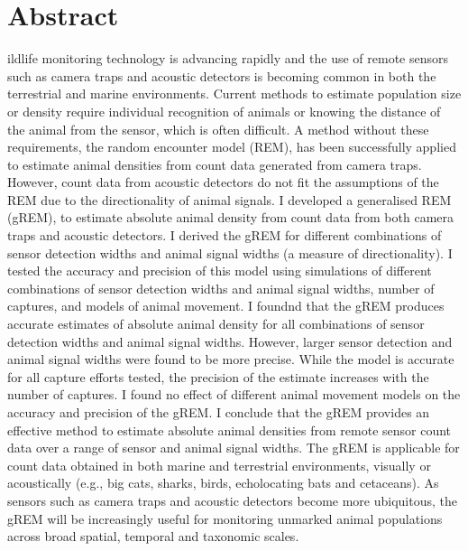 %








  



\section{Abstract}
ildlife monitoring technology is advancing rapidly and the use of remote sensors such as camera traps and acoustic detectors is becoming common in both the terrestrial and marine environments.
Current methods to estimate population size or density require individual recognition of animals or knowing the distance of the animal from the sensor, which is often difficult.
A method without these requirements, the random encounter model (REM), has been successfully applied to estimate animal densities from count data generated from camera traps.
However, count data from acoustic detectors do not fit the assumptions of the REM due to the directionality of animal signals.
I developed a generalised REM (gREM), to estimate absolute animal density from count data from both camera traps and acoustic detectors.
I derived the gREM for different combinations of sensor detection widths and animal signal widths (a measure of directionality).
I tested the accuracy and precision of this model using simulations of different combinations of sensor detection widths and animal signal widths, number of captures, and models of animal movement. 
I foundnd that the gREM produces accurate estimates of absolute animal density for all combinations of sensor detection widths and animal signal widths.
However, larger sensor detection and animal signal widths were found to be more precise.
While the model is accurate for all capture efforts tested, the precision of the estimate increases with the number of captures.
I found no effect of different animal movement models on the accuracy and precision of the gREM.  
I conclude that the gREM provides an effective method to estimate absolute animal densities from remote sensor count data over a range of sensor and animal signal widths.
The gREM is applicable for count data obtained in both marine and terrestrial environments, visually or acoustically (e.g., big cats, sharks, birds, echolocating bats and cetaceans).
As sensors such as camera traps and acoustic detectors become more ubiquitous, the gREM will be increasingly useful for monitoring unmarked animal populations across broad spatial, temporal and taxonomic scales. 

